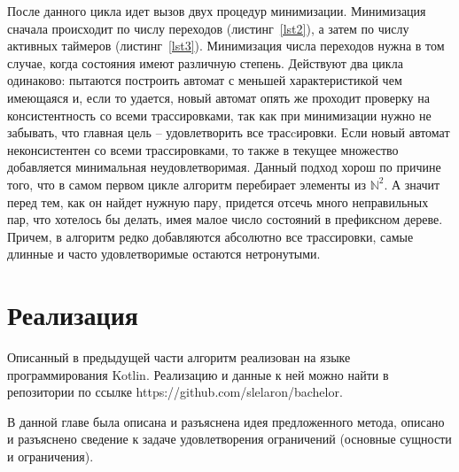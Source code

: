 \documentclass[times,specification,annotation]{itmo-student-thesis}
\begin{document}
После данного цикла идет вызов двух процедур минимизации. 
Минимизация сначала происходит по числу переходов (листинг~\ref{lst2}), а затем по числу активных таймеров (листинг~\ref{lst3}).
Минимизация числа переходов нужна в том случае, когда состояния имеют различную степень. Действуют два цикла одинаково: пытаются построить автомат с меньшей характеристикой чем имеющаяся и,
если то удается, новый автомат опять же проходит проверку на консистентность со всеми трассировками, так как при минимизации нужно не забывать, что главная цель -- удовлетворить все трасcировки.
Если новый автомат неконсистентен со всеми трассировками, то также в текущее множество добавляется минимальная неудовлетворимая. Данный подход хорош по причине того, что
в самом первом цикле алгоритм перебирает элементы из $\mathbb{N}^2$. А значит перед тем, как он найдет нужную пару, придется отсечь много неправильных пар, что хотелось бы делать, имея малое число
состояний в префиксном дереве. Причем, в алгоритм редко добавляются абсолютно все трассировки, самые длинные и часто удовлетворимые остаются нетронутыми.

\section{Реализация}

Описанный в предыдущей части алгоритм реализован на языке программирования Kotlin. Реализацию и данные к ней можно найти в репозитории по ссылке https://github.com/slelaron/bachelor.

\chapterconclusion

В данной главе была описана и разъяснена идея предложенного метода, описано и разъяснено сведение к задаче удовлетворения ограничений (основные сущности и ограничения).
\end{document}
